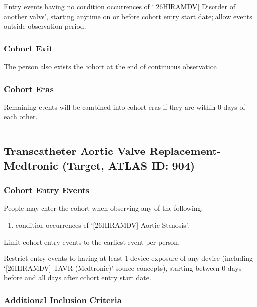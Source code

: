 \documentclass[
  12pt,
]{article}
\providecommand{\tightlist}{%
  \setlength{\itemsep}{0pt}\setlength{\parskip}{0pt}}
\begin{document}
Entry events having no condition occurrences of `{[}26HIRAMDV{]}
Disorder of another valve', starting anytime on or before cohort entry
start date; allow events outside observation period.

\subsubsection{Cohort Exit}\label{cohort-exit-3}

The person also exists the cohort at the end of continuous observation.

\subsubsection{Cohort Eras}\label{cohort-eras-3}

Remaining events will be combined into cohort eras if they are within 0
days of each other.

\begin{center}\rule{0.5\linewidth}{0.5pt}\end{center}

\subsection{Transcatheter Aortic Valve Replacement-Medtronic (Target,
ATLAS ID:
904)}\label{transcatheter-aortic-valve-replacement-medtronic-target-atlas-id-904}

\subsubsection{Cohort Entry Events}\label{cohort-entry-events-4}

People may enter the cohort when observing any of the following:

\begin{enumerate}
\def\labelenumi{\arabic{enumi}.}
\tightlist
\item
  condition occurrences of `{[}26HIRAMDV{]} Aortic Stenosis'.
\end{enumerate}

Limit cohort entry events to the earliest event per person.

Restrict entry events to having at least 1 device exposure of any device
(including `{[}26HIRAMDV{]} TAVR (Medtronic)' source concepts), starting
between 0 days before and all days after cohort entry start date.

\subsubsection{Additional Inclusion
Criteria}\label{additional-inclusion-criteria-4}
\end{document}
